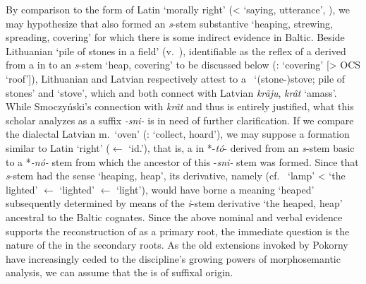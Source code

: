 \documentclass[output=paper,colorlinks,citecolor=brown]{langscibook}
\begin{document}
By comparison to the form of Latin  ‘morally right’ (<  ‘saying, utterance’, ), we may hypothesize that  also formed an \textit{s}-stem substantive  ‘heaping, strewing, spreading, covering’ for which there is some indirect evidence in Baltic. Beside Lithuanian  ‘pile of stones in a field’ (v.\ \citealt[616]{Smoczynski2018}), identifiable as the reflex of a  derived from a  in  to an \textit{s}-stem  ‘heap, covering’ to be discussed below (:  ‘covering’ [> OCS  ‘roof’]), Lithuanian and Latvian respectively attest to a \ ‘(stone-)stove; pile of stones’ and  ‘stove’, which \citet[613]{Smoczynski2018} and \citet[419]{Karulis1992} both connect with Latvian \textit{krãju}, \textit{krât} ‘amass’. While Smoczyński’s connection with \textit{krât} and thus  is entirely justified, what this scholar analyzes as a suffix \textit{-sni-} is in need of further clarification. If we compare the dialectal Latvian  m.\ ‘oven’ (:  ‘collect, hoard’), we may suppose a formation similar to Latin  ‘right’ ($\leftarrow$  ‘id.’), that is, a  in *-\textit{tó}- derived from an \textit{s}-stem basic to a *\textit{-nó-} stem from which the ancestor of this -\textit{sni-} stem was formed. Since that \textit{s}-stem had the sense ‘heaping, heap’, its derivative, namely  (cf.\  ‘lamp’ <  ‘the lighted’ $\leftarrow$  ‘lighted’ $\leftarrow$  ‘light’), would have borne a meaning ‘heaped’ subsequently determined by means of the  \textit{i}-stem derivative  ‘the heaped, heap’ ancestral to the Baltic cognates. Since the above nominal and verbal evidence supports the reconstruction of  as a primary root, the immediate question is the nature of the  in the secondary roots. As the old extensions invoked by Pokorny have increasingly ceded to the discipline’s growing powers of morphosemantic analysis, we can assume that the  is of suffixal origin.
\end{document}
